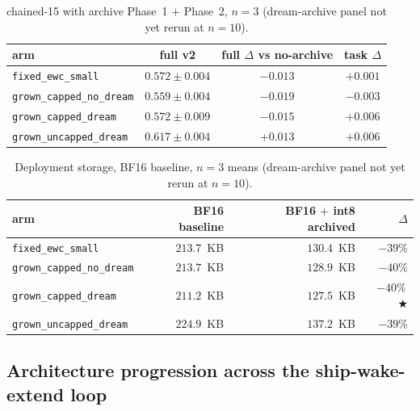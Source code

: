 \documentclass[11pt]{article}
\newcommand{\arm}[1]{\texttt{#1}}
\newcommand{\headline}{$\bigstar$}
\begin{document}
\begin{table}[h]
  \centering
  \caption{chained-15 with archive Phase~1 $+$ Phase~2, $n = 3$
           (dream-archive panel not yet rerun at $n = 10$).}
  \label{tab:supp-archive-acc}
  \begin{tabular}{lccc}
    \toprule
    arm                              & full v2           & full $\Delta$ vs no-archive & task $\Delta$ \\
    \midrule
    \arm{fixed\_ewc\_small}          & $0.572 \pm 0.004$ & $-0.013$                    & $+0.001$      \\
    \arm{grown\_capped\_no\_dream}   & $0.559 \pm 0.004$ & $-0.019$                    & $-0.003$      \\
    \arm{grown\_capped\_dream}       & $0.572 \pm 0.009$ & $-0.015$                    & $+0.006$      \\
    \arm{grown\_uncapped\_dream}     & $0.617 \pm 0.004$ & $+0.013$                    & $+0.006$      \\
    \bottomrule
  \end{tabular}
\end{table}

\begin{table}[h]
  \centering
  \caption{Deployment storage, BF16 baseline, $n = 3$ means
           (dream-archive panel not yet rerun at $n = 10$).}
  \label{tab:supp-archive-storage}
  \begin{tabular}{lrrr}
    \toprule
    arm                              & BF16 baseline & BF16 $+$ int8 archived & $\Delta$        \\
    \midrule
    \arm{fixed\_ewc\_small}          & $213.7$~KB    & $130.4$~KB             & $-39\%$         \\
    \arm{grown\_capped\_no\_dream}   & $213.7$~KB    & $128.9$~KB             & $-40\%$         \\
    \arm{grown\_capped\_dream}       & $211.2$~KB    & $127.5$~KB             & $-40\%$\,\headline \\
    \arm{grown\_uncapped\_dream}     & $224.9$~KB    & $137.2$~KB             & $-39\%$         \\
    \bottomrule
  \end{tabular}
\end{table}

\subsection{Architecture progression across the ship-wake-extend loop}
\label{app:supp-extension}
\end{document}
